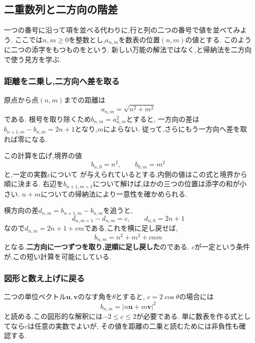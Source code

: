 \subsection{二重数列と二方向の階差}\label{節：二重数列と二方向の階差}
  一つの番号に沿って項を並べる代わりに,行と列の二つの番号で値を並べてみよう.
  ここでは$n,m\ge0$を整数とし,$a_{n,m}$を数表の位置$(n,m)$の値とする.
  このように二つの添字をもつものを\textbf{}という.
  新しい万能の解法ではなく,と帰納法を二方向で使う見方を学ぶ.

  \subsubsection{距離を二乗し,二方向へ差を取る}
  原点から点$(n,m)$までの距離は
  \[ a_{n,m}=\sqrt{n^2+m^2} \]
  である.
  根号を取り除くため$b_{n,m}=a_{n,m}^2$とすると,
  一方向の差は$b_{n+1,m}-b_{n,m}=2n+1$となり,$m$によらない.
  従って,さらにもう一方向へ差を取れば零になる.

  この計算を広げ,境界の値
  \[
    b_{n,0}=n^2,\qquad b_{0,m}=m^2
  \]
  と,一定の実数$c$について
  \BookMathLayout{\[
    b_{n+1,m+1}-b_{n+1,m}-b_{n,m+1}+b_{n,m}=c
  \]}{\[
    \begin{aligned}
      b_{n+1,m+1}-b_{n+1,m}\\
      {}-b_{n,m+1}+b_{n,m}=c
    \end{aligned}
  \]}
  が与えられているとする.内側の値はこの式と境界から順に決まる.
  右辺を$b_{n+1,m+1}$について解けば,ほかの三つの位置は添字の和が小さい.
  $n+m$についての帰納法により一意性を確かめられる.

  横方向の差$d_{n,m}=b_{n+1,m}-b_{n,m}$を追うと,
  \[
    d_{n,m+1}-d_{n,m}=c,\qquad d_{n,0}=2n+1
  \]
  なので$d_{n,m}=2n+1+cm$である.これを横に足し戻せば,
  \[
    b_{n,m}=n^2+m^2+cnm
  \]
  となる.\textbf{二方向に一つずつを取り,逆順に足し戻した}のである.
  $c$が一定という条件が,この短い計算を可能にしている.

  \subsubsection{図形と数え上げに戻る}
  二つの単位ベクトル$\boldsymbol u,\boldsymbol v$のなす角を$\theta$とすると,
  $c=2\cos\theta$の場合には
  \[
    b_{n,m}=|n\boldsymbol u+m\boldsymbol v|^2
  \]
  と読める.この図形的な解釈には$-2\le c\le2$が必要である.
  単に数表を作る式としてなら$c$は任意の実数でよいが,
  その値を距離の二乗と読むためには非負性も確認する.

